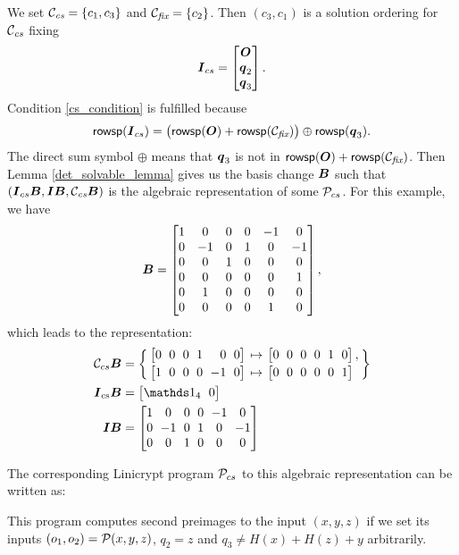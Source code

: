 We set $\Ccs = \{ c_1, c_3 \}$ and $\Cfix = \{c_2\}$.
Then $(c_3, c_1)$ is a solution ordering for $\Ccs$ fixing 
\[
\I_{cs} = \begin{bmatrix}\O \\ \vq_2 \\ \vq_3 \end{bmatrix}.
\]
Condition \eqref{cs_condition} is fulfilled because
\[
\rowsp(\I_{cs}) = \big(\rowsp(\O) + \rowsp(\Cfix)\big) \oplus \rowsp(\vq_3).
\]
The direct sum symbol $\oplus$ means that $\vq_3$ is not in $\rowsp(\O) + \rowsp(\Cfix)$.
Then Lemma \ref{det_solvable_lemma} gives us the basis change $\B$
such that $(\I_{cs} \B, \I \B, \Ccs \B)$ is the algebraic representation of some $\P_{cs}$.
For this example, we have
\[
\B = 
\begin{bmatrix}
1 & 0 & 0 & 0 &-1 & 0 \\
0 &-1 & 0 & 1 & 0 &-1 \\
0 & 0 & 1 & 0 & 0 & 0 \\
0 & 0 & 0 & 0 & 0 & 1 \\
0 & 1 & 0 & 0 & 0 & 0 \\
0 & 0 & 0 & 0 & 1 & 0
\end{bmatrix},
\]
which leads to the representation:
\begin{align*}
    \C_{cs} \B &= \left\{
        \arraycolsep=2pt
        \begin{array}{l l l}
            \m{0 & 0 & 0 & 1 &\phantom{-}0 & 0} & \mapsto & \m{0 & 0 & 0 & 0 & 1 & 0}, \\[2pt]
            \m{1 & 0 & 0 & 0 &-1 & 0} & \mapsto & \m{0 & 0 & 0 & 0 & 0 & 1}
        \end{array}
    \right\} \\
    \I_\textrm{cs} \B &= \m{\Id_4 & 0} \\
    \I \B &= \m{
1 & 0 & 0 & 0 &-1 & 0 \\
0 &-1 & 0 & 1 & 0 &-1 \\
0 & 0 & 1 & 0 & 0 & 0
    }    
\end{align*}

The corresponding Linicrypt program $\P_{cs}$ to this algebraic representation can be written as:

This program computes second preimages to the input $(x,y,z)$
if we set its inputs $(o_1, o_2) = \P(x,y,z)$, $q_2 = z$ and $q_3 \neq H(x) + H(z) + y$ arbitrarily.
